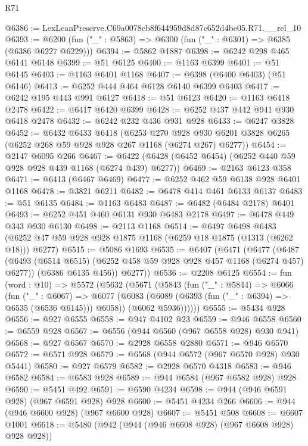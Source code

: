 \begin{lexlean}{R71}
\begin{coremodule}
@6386 := LexLeanPreserve.C69a0078cb8f644959d8d87c652d4be05.R71.__rel_10
@6393 := @6200 (fun ("_" : @5863) => @6300 (fun ("_" : @6301) => @6385 (@6386 @6227 @6229)))
@6394 := @5862 @1887
@6398 := @6242 @298 @465 @6141 @6148
@6399 := @51 @6125
@6400 := @1163 @6399
@6401 := @51 @6145
@6403 := @1163 @6401 @1168
@6407 := @6398 (@6400 @6403) (@51 @6146)
@6413 := @6252 @444 @464 @6128 @6140 @6399 @6403
@6417 := @6242 @195 @443 @991 @6127
@6418 := @51 @6123
@6420 := @1163 @6418 @2478
@6422 := @6417 @6420 @6399
@6428 := @6252 @437 @442 @941 @930 @6418 @2478
@6432 := @6242 @232 @436 @931 @928
@6433 := @6247 @3828
@6452 := @6432
    @6433
    @6418
    (@6253
      @270
      @928
      @930
      @6201
      @3828
      @6265
      (@6252 @268 @59 @928 @928 @267 @1168 (@6274 @267) @6277))
@6454 := @2147 @6095 @266
@6467 := @6422 (@6428 (@6452 @6454) (@6252 @440 @59 @928 @928 @439 @1168 (@6274 @439) @6277))
@6469 := @2163 @6123 @358
@6471 := @6413 (@6467 @6469)
@6477 := @6252 @462 @59 @6138 @928 @6401 @1168
@6478 := @3821 @6211
@6482 := @6478 @414 @461 @6133 @6137
@6483 := @51 @6135
@6484 := @1163 @6483
@6487 := @6482 (@6484 @2178) @6401
@6493 := @6252 @451 @460 @6131 @930 @6483 @2178
@6497 := @6478 @449 @343 @930 @6130
@6498 := @2113 @1168
@6514 := @6497
    @6498
    @6483
    (@6252 @47 @59 @928 @928 @1875 @1168 (@6259 @18 @1875 (@1313 (@6262 @18))) @6277)
@6515 := @5086 @1693
@6535 := @6407
    (@6471
      (@6477
        (@6487
          (@6493 (@6514 @6515) (@6252 @458 @59 @928 @928 @457 @1168 (@6274 @457) @6277))
          (@6386 @6135 @456))
        @6277))
@6536 := @2208 @6125
@6554 := fun (word : @10) =>
  @5572
    (@5632
      (@5671
        (@5843
          (fun ("_" : @5844) =>
          @6066
            (fun ("_" : @6067) =>
            @6077
              (@6083 (@6089 (@6393 (fun ("_" : @6394) => @6535 (@6536 @6145))) @6058))
              (@6062 @5936))))))
@6555 := @5434 @928
@6556 := @927 @6555
@6558 := @947 @4102 @23
@6559 := @946 @6558
@6560 := @6559 @928
@6567 := @6556 (@944 @6560 (@967 @6558 @928) @930 @941)
@6568 := @927 @6567
@6570 := @2928 @6558 @2880
@6571 := @946 @6570
@6572 := @6571 @928
@6579 := @6568 (@944 @6572 (@967 @6570 @928) @930 @5441)
@6580 := @927 @6579
@6582 := @2928 @6570 @4318
@6583 := @946 @6582
@6584 := @6583 @928
@6589 := @944 @6584 (@967 @6582 @928) @928
@6590 := @5451 @492
@6591 := @6590 @4234
@6598 := @944 (@946 @6591 @928) (@967 @6591 @928) @928
@6600 := @5451 @4234 @266
@6606 := @944 (@946 @6600 @928) (@967 @6600 @928)
@6607 := @5451 @508
@6608 := @6607 @1001
@6618 := @5480 (@942 (@944 (@946 @6608 @928) (@967 @6608 @928) @928 @928))

\end{coremodule}
\end{lexlean}
